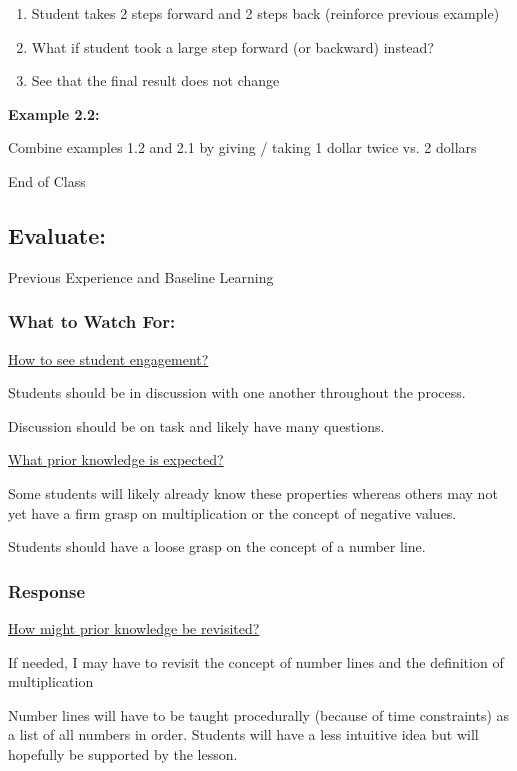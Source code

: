 \documentclass{notes}
\begin{document}
\begin{enumerate}
    \item Student takes 2 steps forward and 2 steps back (reinforce previous example)
    \item What if student took a large step forward (or backward) instead?
    \item See that the final result does not change
\end{enumerate}

\textbf{Example 2.2:}

Combine examples 1.2 and 2.1 by giving / taking 1 dollar twice vs. 2 dollars

End of Class

\subsection{Evaluate:}

Previous Experience and Baseline Learning

\subsubsection{What to Watch For:}

\ul{How to see student engagement?}

Students should be in discussion with one another throughout the process.

Discussion should be on task and likely have many questions.

\ul{What prior knowledge is expected?}

Some students will likely already know these properties whereas others may not yet have a firm grasp on multiplication or the concept of negative values.

Students should have a loose grasp on the concept of a number line.

\subsubsection{Response}

\ul{How might prior knowledge be revisited?}

If needed, I may have to revisit the concept of number lines and the definition of multiplication

Number lines will have to be taught procedurally (because of time constraints) as a list of all numbers in order. Students will have a less intuitive idea but will hopefully be supported by the lesson.
\end{document}
